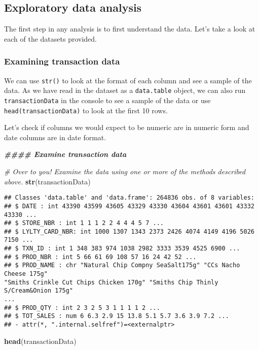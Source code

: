 \documentclass[
]{article}
\newenvironment{Shaded}{\begin{snugshade}}{\end{snugshade}}
\newcommand{\CommentTok}[1]{\textcolor[rgb]{0.56,0.35,0.01}{\textit{#1}}}
\newcommand{\DocumentationTok}[1]{\textcolor[rgb]{0.56,0.35,0.01}{\textbf{\textit{#1}}}}
\newcommand{\FunctionTok}[1]{\textcolor[rgb]{0.13,0.29,0.53}{\textbf{#1}}}
\newcommand{\NormalTok}[1]{#1}
\begin{document}
\subsection{Exploratory data analysis}\label{exploratory-data-analysis}

The first step in any analysis is to first understand the data. Let's
take a look at each of the datasets provided.

\subsubsection{Examining transaction
data}\label{examining-transaction-data}

We can use \texttt{str()} to look at the format of each column and see a
sample of the data. As we have read in the dataset as a
\texttt{data.table} object, we can also run \texttt{transactionData} in
the console to see a sample of the data or use
\texttt{head(transactionData)} to look at the first 10 rows.

Let's check if columns we would expect to be numeric are in numeric form
and date columns are in date format.

\begin{Shaded}
\begin{Highlighting}[]
\DocumentationTok{\#\#\#\# Examine transaction data}


\CommentTok{\# Over to you! Examine the data using one or more of the methods described above.}
\FunctionTok{str}\NormalTok{(transactionData)}
\end{Highlighting}
\end{Shaded}

\begin{verbatim}
## Classes 'data.table' and 'data.frame': 264836 obs. of 8 variables:
## $ DATE : int 43390 43599 43605 43329 43330 43604 43601 43601 43332 43330 ...
## $ STORE_NBR : int 1 1 1 2 2 4 4 4 5 7 ...
## $ LYLTY_CARD_NBR: int 1000 1307 1343 2373 2426 4074 4149 4196 5026 7150 ...
## $ TXN_ID : int 1 348 383 974 1038 2982 3333 3539 4525 6900 ...
## $ PROD_NBR : int 5 66 61 69 108 57 16 24 42 52 ...
## $ PROD_NAME : chr "Natural Chip Compny SeaSalt175g" "CCs Nacho Cheese 175g"
"Smiths Crinkle Cut Chips Chicken 170g" "Smiths Chip Thinly S/Cream&Onion 175g"
...
## $ PROD_QTY : int 2 3 2 5 3 1 1 1 1 2 ...
## $ TOT_SALES : num 6 6.3 2.9 15 13.8 5.1 5.7 3.6 3.9 7.2 ...
## - attr(*, ".internal.selfref")=<externalptr>
\end{verbatim}

\begin{Shaded}
\begin{Highlighting}[]
\FunctionTok{head}\NormalTok{(transactionData)}
\end{Highlighting}
\end{Shaded}
\end{document}
